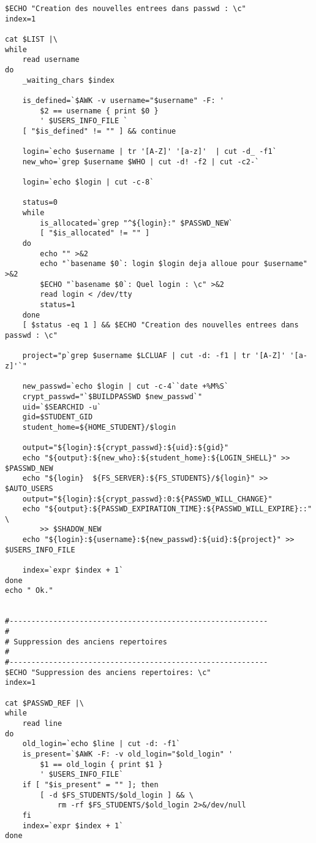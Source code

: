 \begin{verbatim}
$ECHO "Creation des nouvelles entrees dans passwd : \c"
index=1

cat $LIST |\
while
    read username
do
    _waiting_chars $index

    is_defined=`$AWK -v username="$username" -F: '
        $2 == username { print $0 }
        ' $USERS_INFO_FILE `
    [ "$is_defined" != "" ] && continue

    login=`echo $username | tr '[A-Z]' '[a-z]'  | cut -d_ -f1`
    new_who=`grep $username $WHO | cut -d! -f2 | cut -c2-`

    login=`echo $login | cut -c-8`

    status=0
    while
        is_allocated=`grep "^${login}:" $PASSWD_NEW`
        [ "$is_allocated" != "" ]
    do
        echo "" >&2
        echo "`basename $0`: login $login deja alloue pour $username" >&2
        $ECHO "`basename $0`: Quel login : \c" >&2
        read login < /dev/tty
        status=1
    done
    [ $status -eq 1 ] && $ECHO "Creation des nouvelles entrees dans passwd : \c"

    project="p`grep $username $LCLUAF | cut -d: -f1 | tr '[A-Z]' '[a-z]'`"

    new_passwd=`echo $login | cut -c-4``date +%M%S`
    crypt_passwd="`$BUILDPASSWD $new_passwd`"
    uid=`$SEARCHID -u`
    gid=$STUDENT_GID
    student_home=${HOME_STUDENT}/$login

    output="${login}:${crypt_passwd}:${uid}:${gid}"
    echo "${output}:${new_who}:${student_home}:${LOGIN_SHELL}" >> $PASSWD_NEW
    echo "${login}  ${FS_SERVER}:${FS_STUDENTS}/${login}" >> $AUTO_USERS
    output="${login}:${crypt_passwd}:0:${PASSWD_WILL_CHANGE}"
    echo "${output}:${PASSWD_EXPIRATION_TIME}:${PASSWD_WILL_EXPIRE}::" \
        >> $SHADOW_NEW
    echo "${login}:${username}:${new_passwd}:${uid}:${project}" >> $USERS_INFO_FILE 

    index=`expr $index + 1`
done
echo " Ok."


#-----------------------------------------------------------
#
# Suppression des anciens repertoires
#
#-----------------------------------------------------------
$ECHO "Suppression des anciens repertoires: \c"
index=1

cat $PASSWD_REF |\
while
    read line
do
    old_login=`echo $line | cut -d: -f1`
    is_present=`$AWK -F: -v old_login="$old_login" '
        $1 == old_login { print $1 }
        ' $USERS_INFO_FILE`
    if [ "$is_present" = "" ]; then
        [ -d $FS_STUDENTS/$old_login ] && \
            rm -rf $FS_STUDENTS/$old_login 2>&/dev/null
    fi
    index=`expr $index + 1`
done


\end{verbatim}
